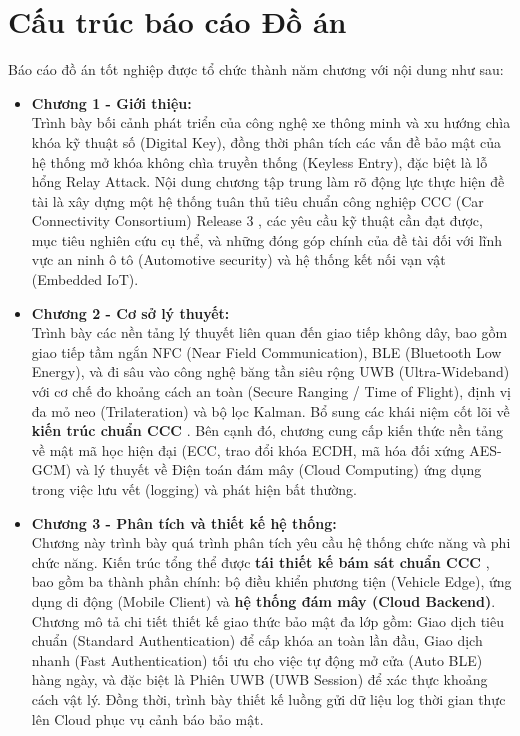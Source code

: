 \section{Cấu trúc báo cáo Đồ án}
Báo cáo đồ án tốt nghiệp được tổ chức thành năm chương với nội dung như sau:

\begin{itemize}
    \item \textbf{Chương 1 - Giới thiệu:}\\
    Trình bày bối cảnh phát triển của công nghệ xe thông minh và xu hướng chìa khóa kỹ thuật số (Digital Key), đồng thời phân tích các vấn đề bảo mật của hệ thống mở khóa không chìa truyền thống (Keyless Entry), đặc biệt là lỗ hổng Relay Attack. Nội dung chương tập trung làm rõ động lực thực hiện đề tài là xây dựng một hệ thống tuân thủ tiêu chuẩn công nghiệp CCC (Car Connectivity Consortium) Release 3 \cite{ccc_digikey3}, các yêu cầu kỹ thuật cần đạt được, mục tiêu nghiên cứu cụ thể, và những đóng góp chính của đề tài đối với lĩnh vực an ninh ô tô (Automotive security) và hệ thống kết nối vạn vật (Embedded IoT).

    \item \textbf{Chương 2 - Cơ sở lý thuyết:}\\
    Trình bày các nền tảng lý thuyết liên quan đến giao tiếp không dây, bao gồm giao tiếp tầm ngắn NFC (Near Field Communication), BLE (Bluetooth Low Energy), và đi sâu vào công nghệ băng tần siêu rộng UWB (Ultra-Wideband) với cơ chế đo khoảng cách an toàn (Secure Ranging / Time of Flight), định vị đa mỏ neo (Trilateration) và bộ lọc Kalman. Bổ sung các khái niệm cốt lõi về \textbf{kiến trúc chuẩn CCC} \cite{ccc_digikey3}. Bên cạnh đó, chương cung cấp kiến thức nền tảng về mật mã học hiện đại (ECC, trao đổi khóa ECDH, mã hóa đối xứng AES-GCM) và lý thuyết về Điện toán đám mây (Cloud Computing) ứng dụng trong việc lưu vết (logging) và phát hiện bất thường.

    \item \textbf{Chương 3 - Phân tích và thiết kế hệ thống:}\\
    Chương này trình bày quá trình phân tích yêu cầu hệ thống chức năng và phi chức năng. Kiến trúc tổng thể được \textbf{tái thiết kế bám sát chuẩn CCC} \cite{ccc_digikey3}, bao gồm ba thành phần chính: bộ điều khiển phương tiện (Vehicle Edge), ứng dụng di động (Mobile Client) và \textbf{hệ thống đám mây (Cloud Backend)}. Chương mô tả chi tiết thiết kế giao thức bảo mật đa lớp gồm: Giao dịch tiêu chuẩn (Standard Authentication) để cấp khóa an toàn lần đầu, Giao dịch nhanh (Fast Authentication) tối ưu cho việc tự động mở cửa (Auto BLE) hàng ngày, và đặc biệt là Phiên UWB (UWB Session) để xác thực khoảng cách vật lý. Đồng thời, trình bày thiết kế luồng gửi dữ liệu log thời gian thực lên Cloud phục vụ cảnh báo bảo mật.


\end{itemize}
